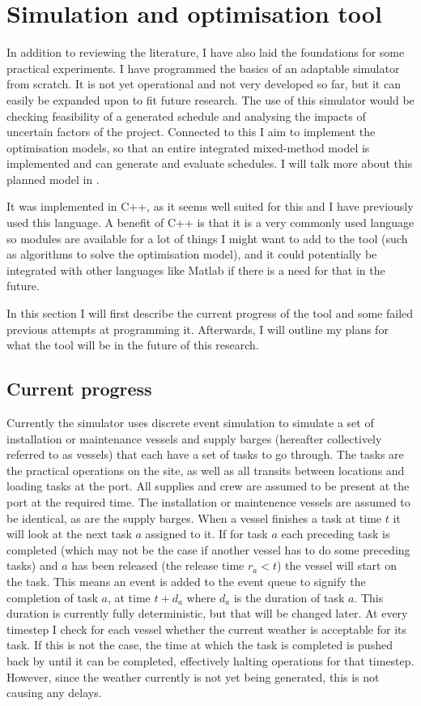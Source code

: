 \documentclass[a4paper,12pt]{article}
\begin{document}
\pagebreak

\section{Simulation and optimisation tool} \label{s:sim}
In addition to reviewing the literature, I have also laid the foundations for some practical experiments. I have programmed the basics of an adaptable simulator from scratch. It is not yet operational and not very developed so far, but it can easily be expanded upon to fit future research. The use of this simulator would be checking feasibility of a generated schedule and analysing the impacts of uncertain factors of the project. Connected to this I aim to implement the optimisation models, so that an entire integrated mixed-method model is implemented and can generate and evaluate schedules. I will talk more about this planned model in .

It was implemented in C++, as it seems well suited for this and I have previously used this language. A benefit of C++ is that it is a very commonly used language so modules are available for a lot of things I might want to add to the tool (such as algorithms to solve the optimisation model), and it could potentially be integrated with other languages like Matlab if there is a need for that in the future. 

In this section I will first describe the current progress of the tool and some failed previous attempts at programming it. Afterwards, I will outline my plans for what the tool will be in the future of this research.

\subsection{Current progress} \label{ss:simprog}
Currently the simulator uses discrete event simulation to simulate a set of installation or maintenance vessels and supply barges (hereafter collectively referred to as vessels) that each have a set of tasks to go through. The tasks are the practical operations on the site, as well as all transits between locations and loading tasks at the port. All supplies and crew are assumed to be present at the port at the required time. The installation or maintenence vessels are assumed to be identical, as are the supply barges. When a vessel finishes a task at time $t$ it will look at the next task $a$ assigned to it. If for task $a$ each preceding task is completed (which may not be the case if another vessel has to do some preceding tasks) and $a$ has been released (the release time $r_a < t$) the vessel will start on the task. This means an event is added to the event queue to signify the completion of task $a$, at time $t + d_a$ where $d_a$ is the duration of task $a$. This duration is currently fully deterministic, but that will be changed later. At every timestep I check for each vessel whether the current weather is acceptable for its task. If this is not the case, the time at which the task is completed is pushed back by until it can be completed, effectively halting operations for that timestep. However, since the weather currently is not yet being generated, this is not causing any delays. 
\end{document}

